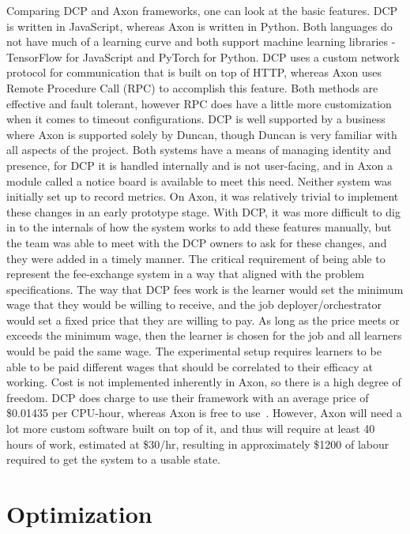 \documentclass[../mthe-493-final-project.tex]{subfiles}
\begin{document}
    Comparing DCP and Axon frameworks, one can look at the basic features. DCP is written in JavaScript, whereas Axon is written in Python. Both languages do not have much of a learning curve and both support machine learning libraries - TensorFlow for JavaScript and PyTorch for Python. DCP uses a custom network protocol for communication that is built on top of HTTP, whereas Axon uses Remote Procedure Call (RPC) to accomplish this feature. Both methods are effective and fault tolerant, however RPC does have a little more customization when it comes to timeout configurations. DCP is well supported by a business where Axon is supported solely by Duncan, though Duncan is very familiar with all aspects of the project. Both systems have a means of managing identity and presence, for DCP it is handled internally and is not user-facing, and in Axon a module called a notice board is available to meet this need. Neither system was initially set up to record metrics. On Axon, it was relatively trivial to implement these changes in an early prototype stage. With DCP, it was more difficult to dig in to the internals of how the system works to add these features manually, but the team was able to meet with the DCP owners to ask for these changes, and they were added in a timely manner. The critical requirement of being able to represent the fee-exchange system in a way that aligned with the problem specifications. The way that DCP fees work is the learner would set the minimum wage that they would be willing to receive, and the job deployer/orchestrator would set a fixed price that they are willing to pay. As long as the price meets or exceeds the minimum wage, then the learner is chosen for the job and all learners would be paid the same wage. The experimental setup requires learners to be able to be paid different wages that should be correlated to their efficacy at working. Cost is not implemented inherently in Axon, so there is a high degree of freedom. DCP does charge to use their framework with an average price of \$0.01435 per CPU-hour, whereas Axon is free to use~\cite{kings-ds-marketing}. However, Axon will need a lot more custom software built on top of it, and thus will require at least 40 hours of work, estimated at \$30/hr, resulting in approximately \$1200 of labour required to get the system to a usable state. 

    \section{Optimization}
    \label{sec:optimization-engineering-tools}
    
\end{document}
